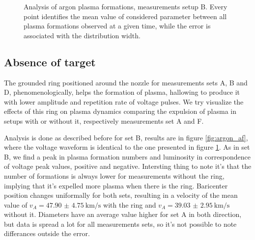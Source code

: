 \begin{figure}
 \hfill
 \caption{Analysis of argon plasma formations, measurements setup B. Every point identifies the mean value of considered parameter between all plasma formations observed at a given time, while the error is associated with the distribution width.}
 \label{fig:argon_b}
\end{figure}


\subsection{Absence of target}
The grounded ring positioned around the nozzle for measurements sets A, B and D, phenomenologically, helps the formation of plasma, hallowing to produce it with lower amplitude and repetition rate of voltage pulses. We try visualize the effects of this ring on plasma dynamics comparing the expulsion of plasma in setups with or without it, respectively measurements set A and F.

Analysis is done as described before for set B, results are in figure \ref{fig:argon_af}, where the voltage waveform is identical to the one presented in figure \ref{fig:argon_b}.
As in set B, we find a peak in plasma formation numbers and luminosity in correspondence of voltage peak values, positive and negative. Intersting thing to note it's that the number of formations is always lower for measurements without the ring, implying that it's expelled more plasma when there is the ring.
Baricenter position changes uniformally for both sets, resulting in a velocity of the mean value of $v_A = \SI{47.90(475)}{\kilo\meter/\second}$ with the ring and $v_A = \SI{39.03(295)}{\kilo\meter/\second}$ without it.
Diameters have an average value higher for set A in both direction, but data is spread a lot for all measurements sets, so it's not possible to note differances outside the error.

